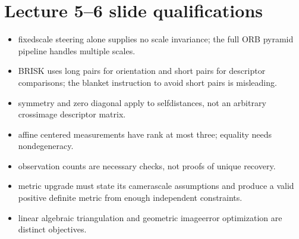 \documentclass[letterpaper,11pt,english,openany,oneside]{jupyterBook}
\begin{document}
\section{Lecture 5–6 slide qualifications}
\label{\detokenize{reference/errata:lecture-56-slide-qualifications}}\begin{itemize}
\item {}
\sphinxAtStartPar
{} fixed\sphinxhyphen{}scale steering alone supplies no scale invariance; the full ORB pyramid pipeline handles multiple scales.

\item {}
\sphinxAtStartPar
{} BRISK uses long pairs for orientation and short pairs for descriptor comparisons; the blanket instruction to avoid short pairs is misleading.

\item {}
\sphinxAtStartPar
{} symmetry and zero diagonal apply to self\sphinxhyphen{}distances, not an arbitrary cross\sphinxhyphen{}image descriptor matrix.

\item {}
\sphinxAtStartPar
{} affine centered measurements have rank at most three; equality needs nondegeneracy.

\item {}
\sphinxAtStartPar
{} observation counts are necessary checks, not proofs of unique recovery.

\item {}
\sphinxAtStartPar
{} metric upgrade must state its camera\sphinxhyphen{}scale assumptions and produce a valid positive definite metric from enough independent constraints.

\item {}
\sphinxAtStartPar
{} linear algebraic triangulation and geometric image\sphinxhyphen{}error optimization are distinct objectives.

\end{itemize}







\renewcommand{\indexname}{Index}
\printindex
\end{document}

